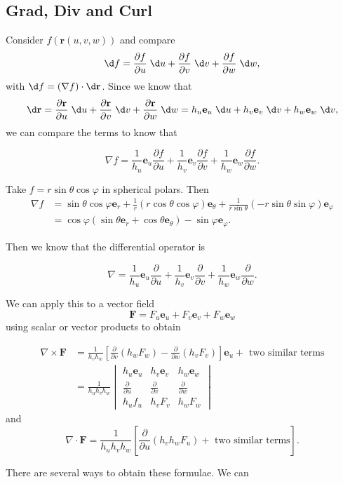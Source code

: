 \documentclass[a4paper]{article}
\begin{document}
\subsection{Grad, Div and Curl}
Consider $f(\mathbf{r}(u, v, w))$ and compare
\[
  \d f = \frac{\partial f}{\partial u}\;\d u + \frac{\partial f}{\partial v}\;\d v + \frac{\partial f}{\partial w}\;\d w,
\]
with $\d f = (\nabla f)\cdot \d \mathbf{r}$. Since we know that
\[
  \d \mathbf{r} = \frac{\partial \mathbf{r}}{\partial u}\;\d u + \frac{\partial \mathbf{r}}{\partial v}\;\d v + \frac{\partial \mathbf{r}}{\partial w}\;\d w = h_u \mathbf{e}_u \;\d u + h_v \mathbf{e}_v \;\d v + h_w \mathbf{e}_w \;\d v,
\]
we can compare the terms to know that
\begin{prop}
  \[
    \nabla f = \frac{1}{h_u} \mathbf{e}_u \frac{\partial f}{\partial u} + \frac{1}{h_v}\mathbf{e}_v \frac{\partial f}{\partial v} + \frac{1}{h_w}\mathbf{e}_w \frac{\partial f}{\partial w}.
  \]
\end{prop}
\begin{eg}
  Take $f = r\sin \theta\cos \varphi$ in spherical polars. Then
  \begin{align*}
    \nabla f &= \sin \theta\cos \varphi \mathbf{e}_r + \frac{1}{r}(r\cos \theta\cos \varphi)\mathbf{e}_\theta + \frac{1}{r\sin \theta}(-r\sin \theta\sin \varphi)\mathbf{e}_\varphi\\
    &= \cos\varphi(\sin \theta \mathbf{e}_r + \cos \theta \mathbf{e}_\theta) - \sin \varphi \mathbf{e}_\varphi.
  \end{align*}
\end{eg}

Then we know that the differential operator is
\begin{prop}
  \[
    \nabla = \frac{1}{h_u}\mathbf{e}_u \frac{\partial }{\partial u} + \frac{1}{h_v}\mathbf{e}_v\frac{\partial }{\partial v} + \frac{1}{h_w}\mathbf{e}_w \frac{\partial}{\partial w}.
  \]
\end{prop}
We can apply this to a vector field
\[
  \mathbf{F} = F_u \mathbf{e}_u + F_v \mathbf{e}_v + F_w \mathbf{e}_w
\]
using scalar or vector products to obtain
\begin{prop}
  \begin{align*}
    \nabla \times \mathbf{F} &= \frac{1}{h_vh_w}\left[\frac{\partial}{\partial v}(h_wF_w) - \frac{\partial }{\partial w}(h_vF_v)\right]\mathbf{e}_u + \text{ two similar terms}\\
    &= \frac{1}{h_uh_vh_w}
    \begin{vmatrix} h_u\mathbf{e}_u & h_v\mathbf{e}_v & h_w \mathbf{e}_w\\
      \frac{\partial}{\partial u} & \frac{\partial}{\partial v} & \frac{\partial}{\partial w}\\
      h_u f_u & h_v F_v & h_wF_w
    \end{vmatrix}
  \end{align*}
  and
  \[
    \nabla\cdot \mathbf{F} = \frac{1}{h_uh_vh_w}\left[\frac{\partial}{\partial u}(h_vh_wF_u) + \text{ two similar terms}\right].
  \]
\end{prop}
There are several ways to obtain these formulae. We can
\end{document}

